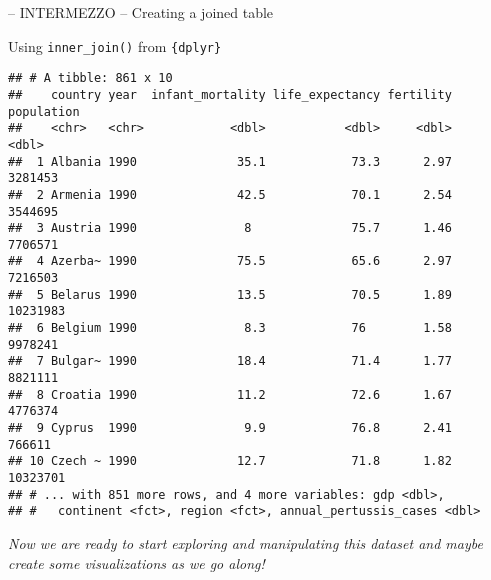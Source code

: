 \documentclass[ignorenonframetext,]{beamer}
\begin{document}
\begin{frame}[fragile]{-- INTERMEZZO -- Creating a joined table}
\begin{block}{Using \texttt{inner\_join()} from \texttt{\{dplyr\}}}
\begin{verbatim}
## # A tibble: 861 x 10
##    country year  infant_mortality life_expectancy fertility population
##    <chr>   <chr>            <dbl>           <dbl>     <dbl>      <dbl>
##  1 Albania 1990              35.1            73.3      2.97    3281453
##  2 Armenia 1990              42.5            70.1      2.54    3544695
##  3 Austria 1990               8              75.7      1.46    7706571
##  4 Azerba~ 1990              75.5            65.6      2.97    7216503
##  5 Belarus 1990              13.5            70.5      1.89   10231983
##  6 Belgium 1990               8.3            76        1.58    9978241
##  7 Bulgar~ 1990              18.4            71.4      1.77    8821111
##  8 Croatia 1990              11.2            72.6      1.67    4776374
##  9 Cyprus  1990               9.9            76.8      2.41     766611
## 10 Czech ~ 1990              12.7            71.8      1.82   10323701
## # ... with 851 more rows, and 4 more variables: gdp <dbl>,
## #   continent <fct>, region <fct>, annual_pertussis_cases <dbl>
\end{verbatim}

\emph{Now we are ready to start exploring and manipulating this dataset
and maybe create some visualizations as we go along!}

\end{block}

\end{frame}
\end{document}
